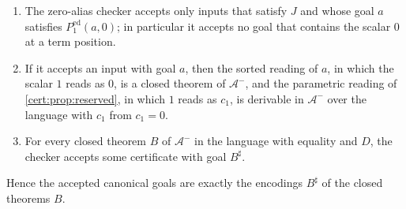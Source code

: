 \begin{proposition}\label{cert:prop:zero-alias}
\begin{enumerate}[label=(\alph*)]
\item The zero-alias checker accepts only inputs that satisfy $J$ and whose goal
$a$ satisfies $P^{\mathrm{ed}}_{1}(a,0)$; in particular it accepts no goal
that contains the scalar $0$ at a term position.
\item If it accepts an input with goal $a$, then the sorted reading of $a$, in
which the scalar $1$ reads as $0$, is a closed theorem of $\mathcal A^{-}$, and
the parametric reading of \cref{cert:prop:reserved}, in which $1$ reads as
$c_1$, is derivable in $\mathcal A^{-}$ over the language with $c_1$ from
$c_1=0$.
\item For every closed theorem $B$ of $\mathcal A^{-}$ in the language with
equality and $D$, the checker accepts some certificate with goal $B^{\sharp}$.
\end{enumerate}
Hence the accepted canonical goals are exactly the encodings $B^{\sharp}$ of the
closed theorems $B$.
\end{proposition}
